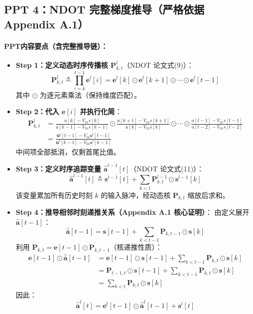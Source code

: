 \documentclass[journal,12pt,onecolumn]{IEEEtran}
\begin{document}
\subsection*{PPT 4：NDOT 完整梯度推导（严格依据 Appendix A.1）}

\paragraph{\textbf{PPT内容要点（含完整推导链）：}}
\begin{itemize}
    \item \textbf{Step 1：定义动态时序传播核 \(\mathbf{P}_{k,t}^{l}\)}（NDOT 论文式(9)）：
    \[
    \mathbf{P}_{k,t}^{l} \triangleq \prod_{i=k}^{t-1} \mathbf{e}^{l}[i]
    = \mathbf{e}^{l}[k] \odot \mathbf{e}^{l}[k+1] \odot \cdots \odot \mathbf{e}^{l}[t-1]
    \]
    其中 \(\odot\) 为逐元素乘法（保持维度匹配）。
    
    \item \textbf{Step 2：代入 \(\mathbf{e}[i]\) 并执行化简}：
    \[
    \begin{aligned}
    \mathbf{P}_{k,t}^{l}
    &=
    \frac{u[k] - V_{th}s[k]}{u[k-1] - V_{th}s[k-1]}
    \odot
    \frac{u[k+1] - V_{th}s[k+1]}{u[k] - V_{th}s[k]}
    \odot
    \cdots
    \odot
    \frac{u[t-1] - V_{th}s[t-1]}{u[t-2] - V_{th}s[t-2]}
    \\
    &=
    \frac{\mathbf{u}^{l}[t-1] - V_{th}\mathbf{s}^{l}[t-1]}
         {\mathbf{u}^{l}[k-1] - V_{th}\mathbf{s}^{l}[k-1]}
    \end{aligned}
    \]
    中间项全部抵消，仅剩首尾比值。
    
    \item \textbf{Step 3：定义时序追踪变量 \(\hat{\mathbf{a}}^{l-1}[t]\)}（NDOT 论文式(11)）：
    \[
    \boxed{
    \hat{\mathbf{a}}^{l-1}[t] \triangleq
    \mathbf{s}^{l-1}[t] + \sum_{k < t} \mathbf{P}_{k,t}^{l-1} \odot \mathbf{s}^{l-1}[k]
    }
    \]
    该变量累加所有历史时刻 \(k\) 的输入脉冲，经动态核 \(\mathbf{P}_{k,t}\) 缩放后求和。
    
    \item \textbf{Step 4：推导相邻时刻递推关系（Appendix A.1 核心证明）}：
    由定义展开 \(\hat{\mathbf{a}}[t-1]\)：
    \[
    \hat{\mathbf{a}}[t-1] = \mathbf{s}[t-1] + \sum_{k < t-1} \mathbf{P}_{k,t-1} \odot \mathbf{s}[k]
    \]
    利用 \(\mathbf{P}_{k,t} = \mathbf{e}[t-1] \odot \mathbf{P}_{k,t-1}\)（核递推性质）：
    \[
    \begin{aligned}
    \mathbf{e}[t-1] \odot \hat{\mathbf{a}}[t-1]
    &= \mathbf{e}[t-1] \odot \mathbf{s}[t-1]
       + \sum_{k < t-1} \mathbf{P}_{k,t} \odot \mathbf{s}[k] \\
    &= \mathbf{P}_{t-1,t} \odot \mathbf{s}[t-1] + \sum_{k < t-1} \mathbf{P}_{k,t} \odot \mathbf{s}[k] \\
    &= \sum_{k < t} \mathbf{P}_{k,t} \odot \mathbf{s}[k]
    \end{aligned}
    \]
    因此：
    \[
    \boxed{
    \hat{\mathbf{a}}^{l}[t] = \mathbf{e}^{l}[t-1] \odot \hat{\mathbf{a}}^{l}[t-1] + \mathbf{s}^{l}[t]
    }
    \]
    

\end{itemize}
\end{document}
